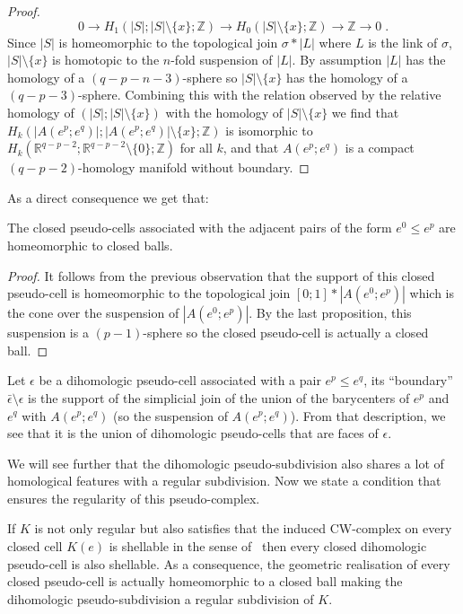 \documentclass[AHL,Unicode,longabstracts,published]{cedram}
\newcommand{\R}{\mathbb{R}}
\newcommand{\Z}{\mathbb{Z}}
\begin{document}
\begin{proof}
\begin{equation*}
0 \rightarrow H_1(|S|;|S|\setminus\{x\};\Z) \rightarrow H_0(|S|\setminus\{x\};\Z) \rightarrow \Z \rightarrow 0\;.
\end{equation*}
Since $|S|$ is homeomorphic to the topological join $\sigma * |L|$ where $L$ is the link of $\sigma$, $|S|\setminus\{x\}$ is homotopic to the $n$-fold suspension of $|L|$. By assumption $|L|$ has the homology of a $(q-p-n-3)$-sphere so $|S|\setminus\{x\}$ has the homology of a $(q-p-3)$-sphere. Combining this with the relation observed by the relative homology of $(|S|;|S|\setminus\{x\})$ with the homology of $|S|\setminus\{x\}$ we find that $H_k(|A(e^p;e^q)|;|A(e^p;e^q)|\setminus\{x\};\Z)$ is isomorphic to $H_k(\R^{q-p-2};\R^{q-p-2}\setminus\{0\};\Z)$ for all $k$, and that $A(e^p;e^q)$ is a compact $(q-p-2)$-homology manifold without boundary.
\end{proof}

As a direct consequence we get that:

\begin{prop}\label{prop:initial_cells}
The closed pseudo-cells associated with the adjacent pairs of the form $e^0\leq e^p$ are homeomorphic to closed balls.
\end{prop}

\begin{proof}
It follows from the previous observation that the support of this closed pseudo-cell is homeomorphic to the topological join $[0;1]*|A(e^0;e^p)|$ which is the cone over the suspension of $|A(e^0;e^p)|$. By the last proposition, this suspension is a $(p-1)$-sphere so the closed pseudo-cell is actually a closed ball.
\end{proof}

Let $\epsilon$ be a dihomologic pseudo-cell associated with a pair $e^p\leq e^q$, its ``boundary'' $\bar{\epsilon}\setminus \epsilon$ is the support of the simplicial join of the union of the barycenters of $e^p$ and $e^q$ with $A(e^p;e^q)$ (so the suspension of $A(e^p;e^q)$). From that description, we see that it is the union of dihomologic pseudo-cells that are faces of $\epsilon$.


We will see further that the dihomologic pseudo-subdivision also shares a lot of homological features with a regular subdivision. Now we state a condition that ensures the regularity of this pseudo-complex.

\begin{prop}\label{prop:dih_reg_shel}
If $K$ is not only regular but also satisfies that the induced CW-complex on every closed cell $K(e)$ is shellable in the sense of~\cite{Bjo_pos_reg} then every closed dihomologic pseudo-cell is also shellable. As a consequence, the geometric realisation of every closed pseudo-cell is actually homeomorphic to a closed ball making the dihomologic pseudo-subdivision a regular subdivision of $K$.
\end{prop}
\end{document}
